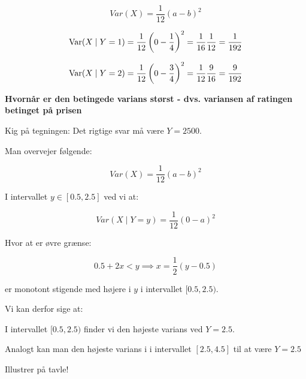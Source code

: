 \begin{equation}
    Var(X) = \frac{1}{12}(a - b)^2
\end{equation}

\begin{equation}
    \text{Var}( X \mid Y =1) = \frac{1}{12}\left( 0 - \frac{1}{4} \right)^2 = \frac{1}{16}\frac{1}{12} = \frac{1}{192}
\end{equation}

\begin{equation}
    \text{Var}(X \mid Y = 2) = \frac{1}{12} \left( 0 - \frac{3}{4} \right)^2 = \frac{1}{12}\frac{9}{16} = \frac{9}{192}
\end{equation}

\textbf{Hvornår er den betingede varians størst - dvs. variansen af ratingen betinget på prisen}

Kig på tegningen: Det rigtige svar må være $Y=2500$.

Man overvejer følgende:

\begin{equation}
    Var(X) = \frac{1}{12}(a - b)^2
\end{equation}

I intervallet $y \in [0.5, 2.5]$ ved vi at:

\begin{equation}
    Var(X \mid Y= y) = \frac{1}{12}(0 - a)^2
\end{equation}

Hvor at er øvre grænse:

\begin{equation}
    0.5 + 2x < y \implies x = \frac{1}{2}(y - 0.5)
\end{equation}

er monotont stigende med højere i $y$ i intervallet $[0.5, 2.5)$.

Vi kan derfor sige at:

I intervallet $[0.5, 2.5)$ finder vi den højeste varians ved $Y=2.5$. 

Analogt kan man den højeste varians i i intervallet $[2.5 , 4.5]$ til at være $Y=2.5$ 

Illustrer på tavle!


